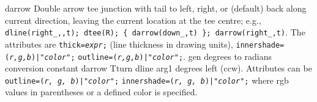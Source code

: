 %
  {darrow}%
  {Double arrow tee junction with tail to left,
   right, or (default) back along current direction, leaving the current
   location at the tee centre; e.g.,
   {\tt dline(right\_,{,}t); dtee(R);
    \{ darrow(down\_,t) \}; darrow(right\_,t)}.
   The attributes are
     {\tt thick={\sl expr};} (line thickness in drawing units),
     {\tt innershade=({\sl r,g,b})|"{\sl color}";}
     {\tt outline=({\sl r,g,b})|"{\sl color}";}. }%
%
  {gen}%
  {degrees to radians conversion constant}%
%
  {darrow}%
  {Tturn dline arg1 degrees left (ccw).
  Attributes can be
    {\tt outline=({\sl r, g, b})|"{\sl color}";}
    {\tt innershade=({\sl r, g, b})|"{\sl color}";}
    where rgb values in parentheses or a defined color is specified.}%

%

